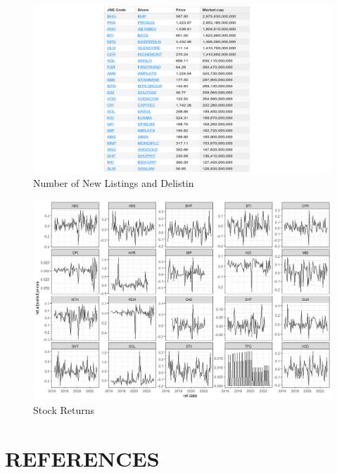 \documentclass[
]{article}
\begin{document}
\begin{figure}
\centering
\includegraphics{stockprice.png}
\caption{Number of New Listings and Delistin}
\end{figure}

\begin{figure}
\centering
\includegraphics{returns.png}
\caption{Stock Returns}
\end{figure}

\newpage

\hypertarget{references}{%
\section{REFERENCES}\label{references}}


\end{document}
